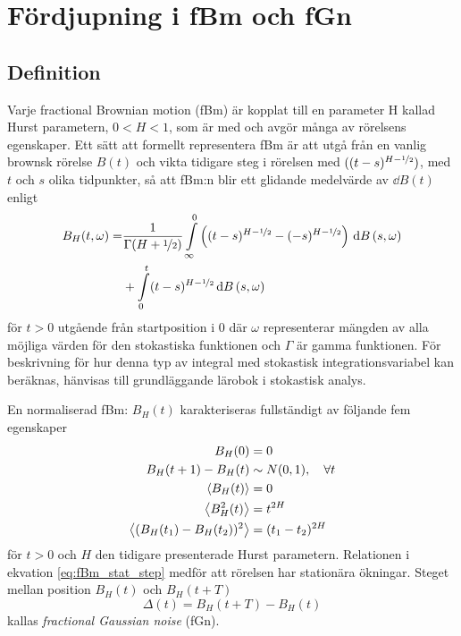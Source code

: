 \chapter{Fördjupning i fBm och fGn}
\label{sec:App_fBm}

\section{Definition}

Varje fractional Brownian motion (fBm) är kopplat till en parameter H kallad Hurst parametern, $0<H<1$, som är med och avgör många av rörelsens egenskaper. Ett sätt att formellt representera fBm är att utgå från en vanlig brownsk rörelse $B(t)$ och vikta tidigare steg i rörelsen med $((t-s)^{H-\nicefrac{1}{2}})$, med $t$ och $s$ olika tidpunkter, så att fBm:n blir ett glidande medelvärde av $\dd{B}(t)$ enligt \cite{Mandelbrot_fBm1968}
\begin{equation} \label{eq:fBm_repr}
\begin{aligned}
    B_H(t,\omega)=& \frac{1}{\Gamma(H+\nicefrac{1}{2})}
    \int_{\infty}^0 \left( (t-s)^{H-\nicefrac{1}{2}}-(-s)^{H-\nicefrac{1}{2}}\right)\,\dd{B}(s,\omega) \\
    &+ \int_0^t (t-s)^{H-\nicefrac{1}{2}} \dd{B}(s,\omega)
\end{aligned}
\end{equation}
för $t>0$ utgående från startposition i 0 där $\omega$ representerar mängden av alla möjliga värden för den stokastiska funktionen och $\Gamma$ är gamma funktionen. För beskrivning för hur denna typ av integral med stokastisk integrationsvariabel kan beräknas, hänvisas till grundläggande lärobok i stokastisk analys.

En normaliserad fBm: $B_H(t)$ karakteriseras fullständigt \cite{Dieker_fBm} av följande fem egenskaper
\begin{subequations}
\begin{align} 
    B_H(0)&=0 \\ 
    B_H(t+1)-B_H(t) &\sim N(0,1)\qcomma \forall t \label{eq:fBm_normstep}\\
    \ev{B_H(t)}&=0 \label{eq:fBm_mean} \\
    \ev{B^2_H(t)}&=t^{2H} \label{eq:fBm_var}\\
    \ev{(B_H(t_1)-B_H(t_2))^2}&=(t_1-t_2)^{2H}  \label{eq:fBm_stat_step}
\end{align}
\end{subequations}
för $t>0$ och $H$ den tidigare presenterade Hurst parametern.  Relationen i ekvation \eqref{eq:fBm_stat_step} medför att rörelsen har stationära ökningar. Steget mellan position $B_H(t)$ och $B_H(t+T)$
\begin{equation} \label{eq:fracGauss}
    \Delta(t) = B_H(t+T) - B_H(t)
\end{equation}
kallas \emph{fractional Gaussian noise} (fGn).

